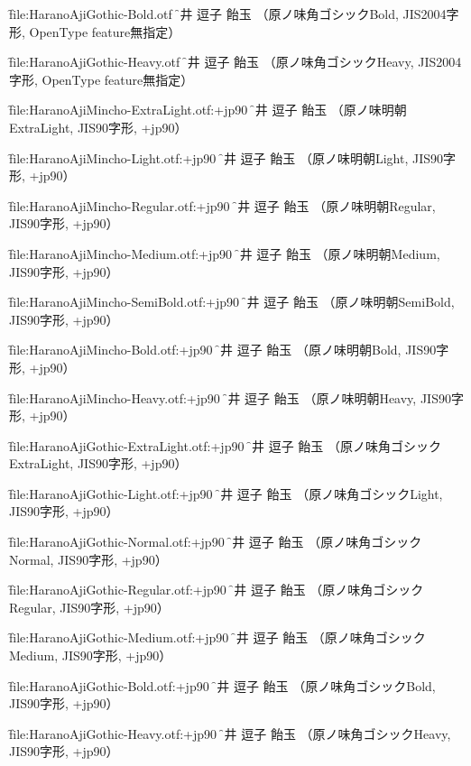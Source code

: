 \font\f{file:HaranoAjiGothic-Bold.otf} \f
辻井 逗子 飴玉 （原ノ味角ゴシックBold, JIS2004字形,
OpenType feature無指定）\par

\font\f{file:HaranoAjiGothic-Heavy.otf} \f
辻井 逗子 飴玉 （原ノ味角ゴシックHeavy, JIS2004字形,
OpenType feature無指定）\par


\font\f{file:HaranoAjiMincho-ExtraLight.otf:+jp90} \f
辻井 逗子 飴玉 （原ノ味明朝ExtraLight, JIS90字形, +jp90）\par

\font\f{file:HaranoAjiMincho-Light.otf:+jp90} \f
辻井 逗子 飴玉 （原ノ味明朝Light, JIS90字形, +jp90）\par

\font\f{file:HaranoAjiMincho-Regular.otf:+jp90} \f
辻井 逗子 飴玉 （原ノ味明朝Regular, JIS90字形, +jp90）\par

\font\f{file:HaranoAjiMincho-Medium.otf:+jp90} \f
辻井 逗子 飴玉 （原ノ味明朝Medium, JIS90字形, +jp90）\par

\font\f{file:HaranoAjiMincho-SemiBold.otf:+jp90} \f
辻井 逗子 飴玉 （原ノ味明朝SemiBold, JIS90字形, +jp90）\par

\font\f{file:HaranoAjiMincho-Bold.otf:+jp90} \f
辻井 逗子 飴玉 （原ノ味明朝Bold, JIS90字形, +jp90）\par

\font\f{file:HaranoAjiMincho-Heavy.otf:+jp90} \f
辻井 逗子 飴玉 （原ノ味明朝Heavy, JIS90字形, +jp90）\par


\font\f{file:HaranoAjiGothic-ExtraLight.otf:+jp90} \f
辻井 逗子 飴玉 （原ノ味角ゴシックExtraLight, JIS90字形, +jp90）\par

\font\f{file:HaranoAjiGothic-Light.otf:+jp90} \f
辻井 逗子 飴玉 （原ノ味角ゴシックLight, JIS90字形, +jp90）\par

\font\f{file:HaranoAjiGothic-Normal.otf:+jp90} \f
辻井 逗子 飴玉 （原ノ味角ゴシックNormal, JIS90字形, +jp90）\par

\font\f{file:HaranoAjiGothic-Regular.otf:+jp90} \f
辻井 逗子 飴玉 （原ノ味角ゴシックRegular, JIS90字形, +jp90）\par

\font\f{file:HaranoAjiGothic-Medium.otf:+jp90} \f
辻井 逗子 飴玉 （原ノ味角ゴシックMedium, JIS90字形, +jp90）\par

\font\f{file:HaranoAjiGothic-Bold.otf:+jp90} \f
辻井 逗子 飴玉 （原ノ味角ゴシックBold, JIS90字形, +jp90）\par

\font\f{file:HaranoAjiGothic-Heavy.otf:+jp90} \f
辻井 逗子 飴玉 （原ノ味角ゴシックHeavy, JIS90字形, +jp90）\par

\bye
